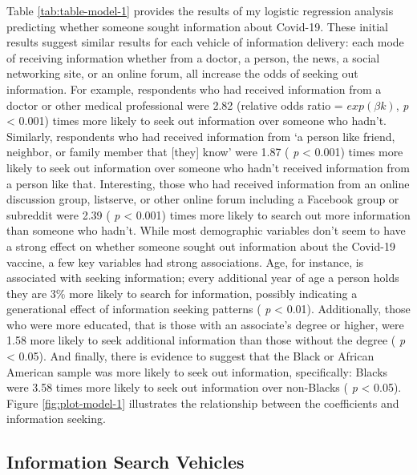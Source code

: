 Table \ref{tab:table-model-1} provides the results of my logistic regression
analysis predicting whether someone sought information about Covid-19. These
initial results suggest similar results for each vehicle of information
delivery: each mode of receiving information whether from a doctor, a person,
the news, a social networking site, or an online forum, all increase the odds of
seeking out information. For example, respondents who had received information
from a doctor or other medical professional were 2.82
(relative odds ratio = \(exp(\beta k)\), \emph{p} \textless{} 0.001) times more likely to seek
out information over someone who hadn't. Similarly, respondents who had received
information from `a person like friend, neighbor, or family member that {[}they{]} know'
were 1.87
( \emph{p} \textless{} 0.001) times more likely to seek out information over someone who hadn't
received information from a person like that. Interesting, those who had
received information from an online discussion group, listserve, or other online
forum including a Facebook group or subreddit were
2.39 ( \emph{p} \textless{} 0.001)
times more likely to search out more information than someone who hadn't. While
most demographic variables don't seem to have a strong effect on whether someone
sought out information about the Covid-19 vaccine, a few key variables had strong
associations. Age, for instance, is associated with seeking information; every
additional year of age a person holds they are
3\%
more likely to search for information, possibly indicating a generational effect
of information seeking patterns ( \emph{p} \textless{} 0.01). Additionally, those who were more
educated, that is those with an associate's degree or higher, were
1.58
more likely to seek additional information than those without the degree
( \emph{p} \textless{} 0.05). And finally, there is evidence to suggest that the Black or
African American sample was more likely to seek out information, specifically:
Blacks were 3.58 times more likely
to seek out information over non-Blacks ( \emph{p} \textless{} 0.05). Figure \ref{fig:plot-model-1} illustrates
the relationship between the coefficients and information seeking.

\hypertarget{information-search-vehicles}{%
\subsection{Information Search Vehicles}\label{information-search-vehicles}}



